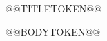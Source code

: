 \documentclass[a4paper, 12pt, twoside]{@@DOCUMENTCLASSTOKEN@@}
\begin{document}
@@TITLETOKEN@@
\tableofcontents
\clearpage

@@BODYTOKEN@@
\end{document}
